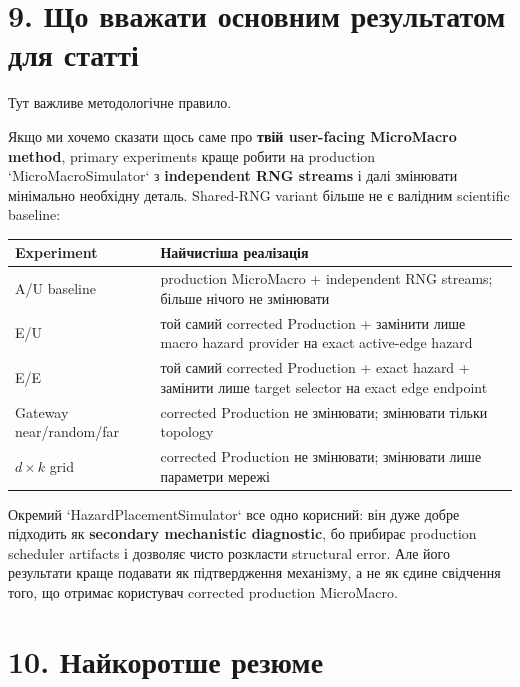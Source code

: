 \documentclass[11pt,a4paper]{article}
\begin{document}
\section*{9. Що вважати основним результатом для статті}

Тут важливе методологічне правило.

Якщо ми хочемо сказати щось саме про \textbf{твій user-facing MicroMacro method}, primary experiments краще робити на production `MicroMacroSimulator` з \textbf{independent RNG streams} і далі змінювати мінімально необхідну деталь. Shared-RNG variant більше не є валідним scientific baseline:

\begin{center}
\begin{tabular}{p{35mm} p{107mm}}
\toprule
\textbf{Experiment} & \textbf{Найчистіша реалізація}\\
\midrule
A/U baseline & production MicroMacro + independent RNG streams; більше нічого не змінювати\\
E/U & той самий corrected Production + замінити лише macro hazard provider на exact active-edge hazard\\
E/E & той самий corrected Production + exact hazard + замінити лише target selector на exact edge endpoint\\
Gateway near/random/far & corrected Production не змінювати; змінювати тільки topology\\
$d\times k$ grid & corrected Production не змінювати; змінювати лише параметри мережі\\
\bottomrule
\end{tabular}
\end{center}

Окремий `HazardPlacementSimulator` все одно корисний: він дуже добре підходить як \textbf{secondary mechanistic diagnostic}, бо прибирає production scheduler artifacts і дозволяє чисто розкласти structural error. Але його результати краще подавати як підтвердження механізму, а не як єдине свідчення того, що отримає користувач corrected production MicroMacro.

\section*{10. Найкоротше резюме}
\end{document}
